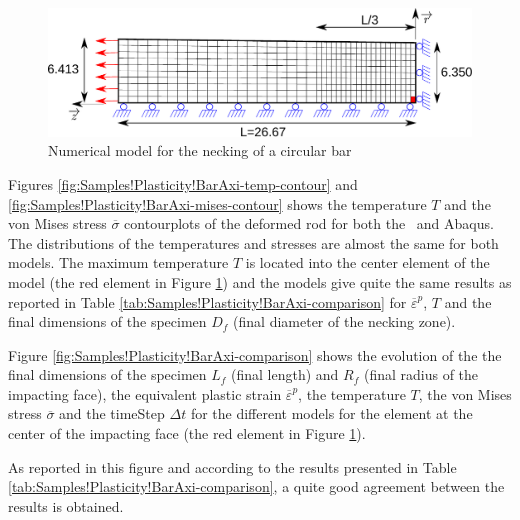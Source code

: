 \begin{figure}[h]
\begin{centering}
\includegraphics[width=0.75\columnwidth]{Figures/BarNecking}
\par\end{centering}
\caption{Numerical model for the necking of a circular bar\label{fig:Samples!Plasticity!NeckingAxi}}
\end{figure}

Figures \ref{fig:Samples!Plasticity!BarAxi-temp-contour} and \ref{fig:Samples!Plasticity!BarAxi-mises-contour}
shows the temperature $T$ and the von Mises stress $\overline{\sigma}$
contourplots of the deformed rod for both the \DynELA~and Abaqus.
The distributions of the temperatures and stresses are almost the
same for both models. The maximum temperature $T$ is located into
the center element of the model (the red element in Figure \ref{fig:Samples!Plasticity!NeckingAxi})
and the models give quite the same results as reported in Table \ref{tab:Samples!Plasticity!BarAxi-comparison}
for $\overline{\varepsilon}^{p}$, $T$ and the final dimensions of
the specimen $D_{f}$ (final diameter of the necking zone).

Figure \ref{fig:Samples!Plasticity!BarAxi-comparison} shows the evolution
of the the final dimensions of the specimen $L_{f}$ (final length)
and $R_{f}$ (final radius of the impacting face), the equivalent
plastic strain $\overline{\varepsilon}^{p}$, the temperature $T$,
the von Mises stress $\overline{\sigma}$ and the timeStep $\Delta t$
for the different models for the element at the center of the impacting
face (the red element in Figure \ref{fig:Samples!Plasticity!NeckingAxi}).

As reported in this figure and according to the results presented
in Table \ref{tab:Samples!Plasticity!BarAxi-comparison}, a quite
good agreement between the results is obtained.

